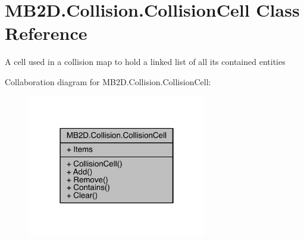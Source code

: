\hypertarget{class_m_b2_d_1_1_collision_1_1_collision_cell}{}\section{M\+B2\+D.\+Collision.\+Collision\+Cell Class Reference}
\label{class_m_b2_d_1_1_collision_1_1_collision_cell}


A cell used in a collision map to hold a linked list of all its contained entities  




Collaboration diagram for M\+B2\+D.\+Collision.\+Collision\+Cell\+:\nopagebreak
\begin{figure}[H]
\begin{center}
\leavevmode
\includegraphics[width=222pt]{class_m_b2_d_1_1_collision_1_1_collision_cell__coll__graph}
\end{center}
\end{figure}

